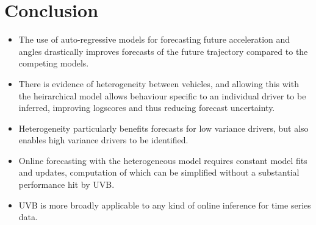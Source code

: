 \documentclass[12pt,a4paper]{article}\usepackage[]{graphicx}\usepackage[]{color}
\begin{document}
\newpage


\section{Conclusion}
\begin{itemize}
\item The use of auto-regressive models for forecasting future acceleration and angles drastically improves forecasts of the future trajectory compared to the competing models.
\item There is evidence of heterogeneity between vehicles, and allowing this with the heirarchical model allows behaviour specific to an individual driver to be inferred, improving logscores and thus reducing forecast uncertainty. 
\item Heterogeneity particularly benefits forecasts for low variance drivers, but also enables high variance drivers to be identified.
\item Online forecasting with the heterogeneous model requires constant model fits and updates, computation of which can be simplified without a substantial performance hit by UVB.
\item UVB is more broadly applicable to any kind of online inference for time series data.
\end{itemize}

\newpage


\end{document}
